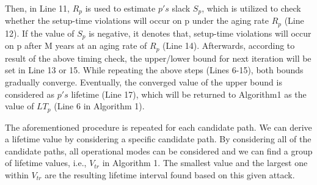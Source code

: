 Then, in Line 11, $R_{p}$ is used to estimate $p's$ slack $S_{p}$, which is utilized to check whether the setup-time violations will occur on p under the aging rate $R_{p}$ (Line 12). If the value of $S_{p}$ is negative, it denotes that, setup-time violations will occur on p after M years at an aging rate of $R_{p}$ (Line 14). Afterwards, according to result of the above timing check, the upper/lower bound for next iteration will be set in Line 13 or 15. While repeating the above steps (Lines 6-15), both bounds gradually converge. Eventually, the converged value of the upper bound is considered as $p's$ lifetime (Line 17), which will be returned to Algorithm1 as the value of $LT_{p}$ (Line 6 in Algorithm 1).

The aforementioned procedure is repeated for each candidate path. We can derive a lifetime value by considering a specific candidate path. By considering all of the candidate
paths, all operational modes can be considered and we can find a group of lifetime values, i.e., $V_{tr}$ in Algorithm 1. The smallest value and the largest one within $V_{tr}$ are the resulting lifetime interval found based on this given attack.